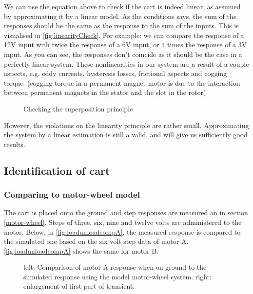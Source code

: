 \documentclass[a4paper]{article}
\newcommand{\newpar}{\vspace{.3cm}\noindent}
\begin{document}
\newpar
We can use the equation above to check if the cart is indeed linear, as assumed by approximating it by a linear model. As the conditions says, the sum of the responses should be the same as the response to the sum of the inputs.  This is visualised in \autoref{fig:linearityCheck}. For example: we can compare the response of a 12V input with twice the response of a 6V input, or 4 times the response of a 3V input. As you can see, the responses don't coincide as it should be the case in a perfectly linear system. These nonlinearities in our system are a result of a couple aspects, e.g. eddy currents, hysteresis losses, frictional aspects and cogging torque. (cogging torque in a permanent magnet motor is due to the interaction between permanent magnets in the stator and the slot in the rotor)

\begin{figure}[H]
    \caption{Checking the superposition principle}
    \label{fig:linearityCheck}
\end{figure}

\newpar
However, the violations on the linearity principle are rather small. Approximating the system by a linear estimation is still a valid, and will give us sufficiently good results. 

\subsection{Identification of cart}
\subsubsection{Comparing to motor-wheel model}
The cart is placed onto the ground and step responses are measured an in section \ref{motor-wheel}. Steps of three, six, nine and twelve volts are administered to the motor. Below, in \autoref{fig:loadunloadcompA}, the measured response is compared to the simulated one based on the six volt step data of motor A. \autoref{fig:loadunloadcompA} shows the same for motor B.

\begin{figure}[H]
    \caption{left: Comparison of motor A response when on ground to the simulated response using the model motor-wheel system. right: enlargement of first part of transient.}
    \label{fig:loadunloadcompA}
\end{figure}
\end{document}
